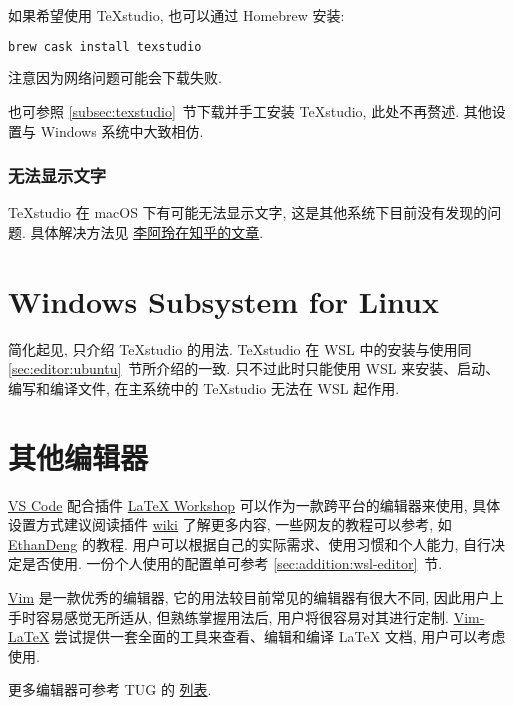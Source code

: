 如果希望使用 \TeX studio, 也可以通过 Homebrew 安装:
\begin{lstlisting}[language=bash]
  brew cask install texstudio
\end{lstlisting}
注意因为网络问题可能会下载失败.

也可参照 \ref{subsec:texstudio}~节下载并手工安装 \TeX studio, 此处不再赘述.
其他设置与 Windows 系统中大致相仿.

\subsubsection{无法显示文字}

\TeX studio 在 macOS 下有可能无法显示文字,
这是其他系统下目前没有发现的问题.
具体解决方法见%
\href{https://zhuanlan.zhihu.com/p/80728204}{李阿玲在知乎的文章}.

\section{Windows Subsystem for Linux}\label{sec:editor:wsl}

简化起见,
只介绍 \TeX studio 的用法.
\TeX studio 在 WSL 中的安装与使用同 \ref{sec:editor:ubuntu}~节所介绍的一致.
只不过此时只能使用 WSL 来安装、启动、编写和编译文件,
在主系统中的 \TeX studio 无法在 WSL 起作用.

\section{其他编辑器}

\href{https://code.visualstudio.com/}{VS Code}
配合插件
\href{https://marketplace.visualstudio.com/items?itemName=James-Yu.latex-workshop}{LaTeX Workshop}
可以作为一款跨平台的编辑器来使用,
具体设置方式建议阅读插件
\href{https://github.com/James-Yu/LaTeX-Workshop/wiki}{wiki}
了解更多内容,
一些网友的教程可以参考,
如
\href{https://github.com/EthanDeng/vscode-latex}{EthanDeng}
的教程.
用户可以根据自己的实际需求、使用习惯和个人能力,
自行决定是否使用.
一份个人使用的配置单可参考 \ref{sec:addition:wsl-editor}~节.

\href{https://www.vim.org/}{Vim} 是一款优秀的编辑器,
它的用法较目前常见的编辑器有很大不同,
因此用户上手时容易感觉无所适从,
但熟练掌握用法后,
用户将很容易对其进行定制.
\href{http://vim-latex.sourceforge.net/}{Vim-LaTeX}
尝试提供一套全面的工具来查看、编辑和编译 \LaTeX{} 文档,
用户可以考虑使用.

更多编辑器可参考 TUG 的%
\href{https://tug.org/interest.html#editors}{列表}.

